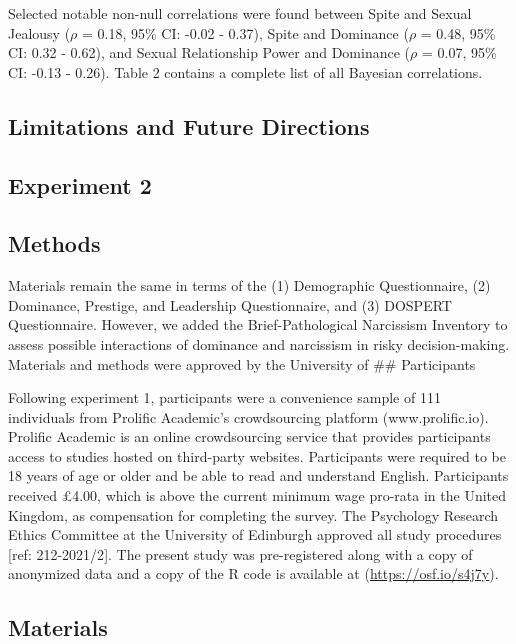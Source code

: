 \documentclass[
  donotrepeattitle,doc, 12pt, a4paper,floatsintext]{apa7}
\begin{document}
Selected notable non-null correlations were found between Spite and Sexual Jealousy (\(\rho\) = 0.18, 95\% CI: -0.02 - 0.37), Spite and Dominance (\(\rho\) = 0.48, 95\% CI: 0.32 - 0.62), and Sexual Relationship Power and Dominance (\(\rho\) = 0.07, 95\% CI: -0.13 - 0.26). Table 2 contains a complete list of all Bayesian correlations.

\hypertarget{limitations-and-future-directions}{%
\subsection{Limitations and Future Directions}\label{limitations-and-future-directions}}

\hypertarget{experiment-2}{%
\subsection{Experiment 2}\label{experiment-2}}

\hypertarget{methods}{%
\subsection{Methods}\label{methods}}

Materials remain the same in terms of the (1) Demographic Questionnaire, (2) Dominance, Prestige, and Leadership Questionnaire, and (3) DOSPERT Questionnaire. However, we added the Brief-Pathological Narcissism Inventory to assess possible interactions of dominance and narcissism in risky decision-making. Materials and methods were approved by the University of
\#\# Participants

Following experiment 1, participants were a convenience sample of 111 individuals from Prolific Academic's crowdsourcing platform (www.prolific.io). Prolific Academic is an online crowdsourcing service that provides participants access to studies hosted on third-party websites. Participants were required to be 18 years of age or older and be able to read and understand English. Participants received £4.00, which is above the current minimum wage pro-rata in the United Kingdom, as compensation for completing the survey. The Psychology Research Ethics Committee at the University of Edinburgh approved all study procedures {[}ref: 212-2021/2{]}. The present study was pre-registered along with a copy of anonymized data and a copy of the R code is available at (\url{https://osf.io/s4j7y}).

\hypertarget{materials}{%
\subsection{Materials}\label{materials}}
\end{document}
